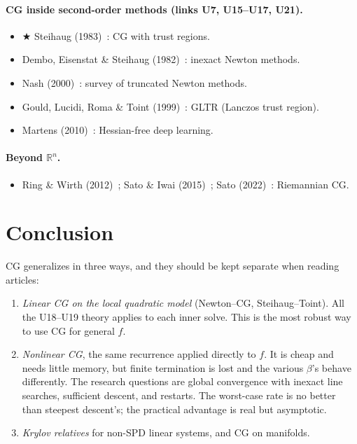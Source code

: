\documentclass[11pt,a4paper]{article}
\theoremstyle{remark}
\newcommand{\R}{\mathbb{R}}
\begin{document}
\paragraph{CG inside second-order methods (links U7, U15--U17, U21).}
\begin{itemize}[leftmargin=1.5em,itemsep=2pt]
\item $\bigstar$ Steihaug (1983)~\cite{Steihaug1983}: CG with trust regions.
\item Dembo, Eisenstat \& Steihaug (1982)~\cite{DemboEisenstatSteihaug1982}: inexact Newton methods.
\item Nash (2000)~\cite{Nash2000}: survey of truncated Newton methods.
\item Gould, Lucidi, Roma \& Toint (1999)~\cite{GouldLucidiRomaToint1999}: GLTR (Lanczos trust region).
\item Martens (2010)~\cite{Martens2010}: Hessian-free deep learning.
\end{itemize}

\paragraph{Beyond $\R^n$.}
\begin{itemize}[leftmargin=1.5em,itemsep=2pt]
\item Ring \& Wirth (2012)~\cite{RingWirth2012}; Sato \& Iwai (2015)~\cite{SatoIwai2015}; Sato (2022)~\cite{Sato2022}: Riemannian CG.
\end{itemize}

\section{Conclusion}
CG generalizes in three ways, and they should be kept separate when reading articles:
\begin{enumerate}[leftmargin=1.5em]
\item \emph{Linear CG on the local quadratic model} (Newton--CG, Steihaug--Toint). All the U18--U19 theory applies to each inner solve. This is the most robust way to use CG for general $f$.
\item \emph{Nonlinear CG}, the same recurrence applied directly to $f$. It is cheap and needs little memory, but finite termination is lost and the various $\beta$'s behave differently. The research questions are global convergence with inexact line searches, sufficient descent, and restarts. The worst-case rate is no better than steepest descent's; the practical advantage is real but asymptotic.
\item \emph{Krylov relatives} for non-SPD linear systems, and CG on manifolds.
\end{enumerate}
\end{document}
